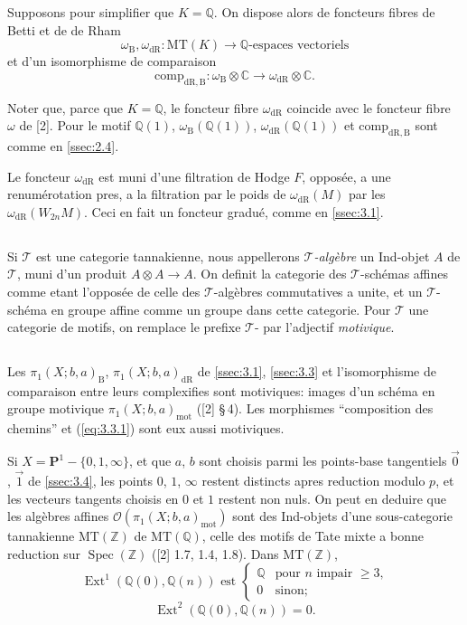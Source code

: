 \documentclass[11pt,a4paper]{article}
\theoremstyle{plain}
\theoremstyle{definition}
\DeclareMathOperator{\Ext}{Ext}
\DeclareMathOperator{\Spec}{Spec}
\newcommand{\Z}{\mathbb{Z}}
\newcommand{\Q}{\mathbb{Q}}
\newcommand{\C}{\mathbb{C}}
\newcommand{\dR}{\mathrm{dR}}
\newcommand{\B}{\mathrm{B}}
\newcommand{\mot}{\mathrm{mot}}
\newcommand{\comp}{\mathrm{comp}}
\newcommand{\MT}{\mathrm{MT}}
\begin{document}
Supposons pour simplifier que $K = \Q$. On dispose alors de foncteurs fibres de Betti et de de Rham
\[
\omega_{\B}, \omega_{\dR}: \MT(K) \to \Q\text{-espaces vectoriels}
\]
et d'un isomorphisme de comparaison
\[
\comp_{\dR,\B}: \omega_{\B} \otimes \C \to \omega_{\dR} \otimes \C.
\]

Noter que, parce que $K = \Q$, le foncteur fibre $\omega_{\dR}$ coincide avec le foncteur fibre $\omega$ de [2]. Pour le motif $\Q(1)$, $\omega_{\B}(\Q(1))$, $\omega_{\dR}(\Q(1))$ et $\comp_{\dR,\B}$ sont comme en \ref{ssec:2.4}.

Le foncteur $\omega_{\dR}$ est muni d'une filtration de Hodge $F$, oppos\'ee, a une renum\'erotation pres, a la filtration par le poids de $\omega_{\dR}(M)$ par les $\omega_{\dR}(W_{2n} M)$. Ceci en fait un foncteur gradu\'e, comme en \ref{ssec:3.1}.

\subsection{}\label{ssec:5.3}

Si $\mathcal{T}$ est une categorie tannakienne, nous appellerons \emph{$\mathcal{T}$-alg\`ebre} un Ind-objet $A$ de $\mathcal{T}$, muni d'un produit $A \otimes A \to A$. On definit la categorie des $\mathcal{T}$-sch\'emas affines comme etant l'oppos\'ee de celle des $\mathcal{T}$-alg\`ebres commutatives a unite, et un $\mathcal{T}$-sch\'ema en groupe affine comme un groupe dans cette categorie. Pour $\mathcal{T}$ une categorie de motifs, on remplace le prefixe $\mathcal{T}$- par l'adjectif \emph{motivique}.

\subsection{}\label{ssec:5.4}

Les $\pi_1(X;b,a)_{\B}$, $\pi_1(X;b,a)_{\dR}$ de \ref{ssec:3.1}, \ref{ssec:3.3} et l'isomorphisme de comparaison entre leurs complexifies sont motiviques: images d'un sch\'ema en groupe motivique $\pi_1(X;b,a)_{\mot}$ ([2] \S\,4). Les morphismes ``composition des chemins'' et (\ref{eq:3.3.1}) sont eux aussi motiviques.

Si $X = \mathbf{P}^1 - \{0,1,\infty\}$, et que $a$, $b$ sont choisis parmi les points-base tangentiels $\vec{0}$, $\vec{1}$ de \ref{ssec:3.4}, les points $0$, $1$, $\infty$ restent distincts apres reduction modulo $p$, et les vecteurs tangents choisis en $0$ et $1$ restent non nuls. On peut en deduire que les alg\`ebres affines $\mathcal{O}(\pi_1(X;b,a)_{\mot})$ sont des Ind-objets d'une sous-categorie tannakienne $\MT(\Z)$ de $\MT(\Q)$, celle des motifs de Tate mixte a bonne reduction sur $\Spec(\Z)$ ([2] 1.7, 1.4, 1.8). Dans $\MT(\Z)$,
\begin{equation}\label{eq:5.4.1}
\Ext^1(\Q(0),\Q(n)) \text{ est } \begin{cases} \Q & \text{pour $n$ impair $\geq 3$,} \\ 0 & \text{sinon;} \end{cases}
\end{equation}
\begin{equation}\label{eq:5.4.2}
\Ext^2(\Q(0),\Q(n)) = 0.
\end{equation}
\end{document}
